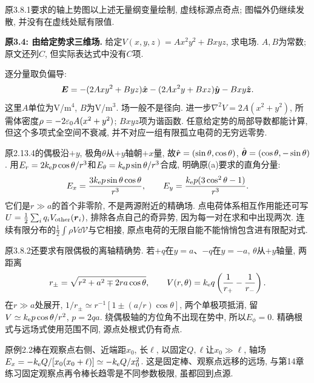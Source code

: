 \begin{center}
\end{center}
原3.8.1要求的轴上势图以上述无量纲变量绘制, 虚线标源点奇点; 图幅外仍继续发散, 并没有在虚线处赋有限值.

\begin{example}
\textbf{原3.4: 由给定势求三维场.} 
给定$V(x,y,z)=Ax^2y^2+Bxyz$, 求电场. $A,B$为常数; 原文还列$C$, 但实际表达式中没有$C$项.
\end{example}
\begin{solution}
逐分量取负偏导:
\[\boldsymbol{E}=-(2Axy^2+Byz)\hat{\boldsymbol{x}}-(2Ax^2y+Bxz)\hat{\boldsymbol{y}}-Bxy\hat{\boldsymbol{z}}.\]
这里$A$单位为V/m$^4$, $B$为V/m$^3$. 场一般不是径向. 进一步$\nabla^2V=2A(x^2+y^2)$, 所需体密度$\rho=-2\varepsilon_0 A(x^2+y^2)$; $Bxyz$项为谐函数. 任意给定势的局部导数都能计算, 但这个多项式全空间不衰减, 并不对应一组有限孤立电荷的无穷远零势.
\end{solution}

原2.13.4的偶极沿$+y$, 极角$\theta$从$+y$轴朝$+x$量, 故$\hat{\boldsymbol{r}}=(\sin\theta,\cos\theta)$, $\hat{\boldsymbol{\theta}}=(\cos\theta,-\sin\theta)$. 用$E_r=2k_{\mathrm e} p\cos\theta/r^3$和$E_\theta=k_{\mathrm e} p\sin\theta/r^3$合成, 明确原(a)要求的直角分量:
\[E_x=\frac{3k_{\mathrm e} p\sin\theta\cos\theta}{r^3},\qquad
E_y=\frac{k_{\mathrm e} p(3\cos^2\theta-1)}{r^3}.\]
它们是$r\gg a$的首个非零阶, 不是两源附近的精确场. 点电荷体系相互作用能还可写$U=\tfrac12\sum_iq_iV_{\rm other}(\boldsymbol{r}_i)$, 排除各点自己的奇异势, 因为每一对在求和中出现两次. 连续有限分布的$\tfrac12\int\rho V\dd\mathcal V$与它相接, 原点电荷的无限自能不能悄悄包含进有限配对式.

原3.8.2还要求有限偶极的离轴精确势. 若$+q$在$y=a$、$-q$在$y=-a$, $\theta$从$+y$轴量, 两距离
\[r_\pm=\sqrt{r^2+a^2\mp2ra\cos\theta},\qquad
V(r,\theta)=k_{\mathrm e} q\left(\frac1{r_+}-\frac1{r_-}\right).\]
在$r\gg a$处展开, $1/r_\pm\simeq r^{-1}[1\pm(a/r)\cos\theta]$, 两个单极项抵消, 留$V\simeq k_{\mathrm e} p\cos\theta/r^2$, $p=2qa$. 绕偶极轴的方位角不出现在势中, 所以$E_\phi=0$. 精确根式与远场式使用范围不同, 源点处根式仍有奇点.

原例2.2棒在观察点右侧、近端距$x_0$, 长$\ell$, 以固定$Q,\ell$让$x_0\gg\ell$, 轴场$E_x=-k_{\mathrm e} Q/[x_0(x_0+\ell)]\simeq-k_{\mathrm e} Q/x_0^2$. 这是固定棒、观察点远移的远场, 与第14章练习固定观察点再令棒长趋零是不同参数极限, 虽都回到点源.
